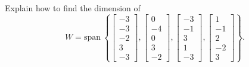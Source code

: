 \documentclass{article}
\begin{document}
\begin{exerciseStatement}
    Explain how to find the dimension of
\[W=\mathrm{span}\ \left\{\left[\begin{array}{r}
-3 \\
-3 \\
-2 \\
3 \\
-3
\end{array}\right] , \left[\begin{array}{r}
0 \\
-4 \\
0 \\
3 \\
-2
\end{array}\right] , \left[\begin{array}{r}
-3 \\
-1 \\
3 \\
1 \\
-3
\end{array}\right] , \left[\begin{array}{r}
1 \\
-1 \\
2 \\
-2 \\
3
\end{array}\right]\right\}.\]



  
\end{exerciseStatement}
\end{document}
